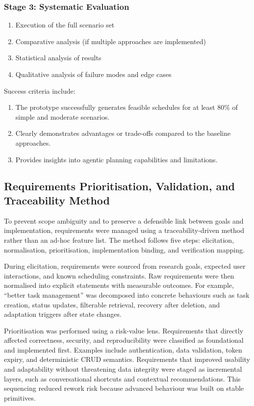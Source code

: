 \documentclass[12pt]{article}
\begin{document}
\subsubsection{Stage 3: Systematic Evaluation}
\begin{enumerate}
    \item Execution of the full scenario set
    \item Comparative analysis (if multiple approaches are implemented)
    \item Statistical analysis of results
    \item Qualitative analysis of failure modes and edge cases
\end{enumerate}
Success criteria include:
\begin{enumerate}
    \item The prototype successfully generates feasible schedules for at least 80\% of simple and moderate scenarios.
    \item Clearly demonstrates advantages or trade-offs compared to the baseline approaches.
    \item Provides insights into agentic planning capabilities and limitations.
\end{enumerate}

\subsection{Requirements Prioritisation, Validation, and Traceability Method}
To prevent scope ambiguity and to preserve a defensible link between goals and implementation, requirements were managed using a traceability-driven method rather than an ad-hoc feature list. The method follows five steps: elicitation, normalisation, prioritisation, implementation binding, and verification mapping.

During elicitation, requirements were sourced from research goals, expected user interactions, and known scheduling constraints. Raw requirements were then normalised into explicit statements with measurable outcomes. For example, ``better task management'' was decomposed into concrete behaviours such as task creation, status updates, filterable retrieval, recovery after deletion, and adaptation triggers after state changes.

Prioritisation was performed using a risk-value lens. Requirements that directly affected correctness, security, and reproducibility were classified as foundational and implemented first. Examples include authentication, data validation, token expiry, and deterministic CRUD semantics. Requirements that improved usability and adaptability without threatening data integrity were staged as incremental layers, such as conversational shortcuts and contextual recommendations. This sequencing reduced rework risk because advanced behaviour was built on stable primitives.
\end{document}
